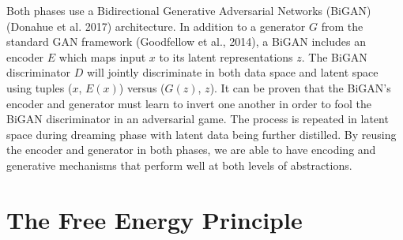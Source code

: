 \documentclass{article}
\begin{document}
Both phases use a Bidirectional Generative Adversarial Networks (BiGAN) (Donahue et al. 2017) architecture. In addition to a generator $G$ from the standard GAN framework (Goodfellow et al., 2014), a BiGAN includes an encoder $E$ which maps input $x$ to its latent representations $z$. The BiGAN discriminator $D$  will jointly discriminate in both data space and latent space using tuples ($x$, $E(x)$) versus ($G(z)$, $z$). It can be proven that the BiGAN's encoder and generator must learn to invert one another in order to fool the BiGAN discriminator in an adversarial game. The process is repeated in latent space during dreaming phase with latent data being further distilled. By reusing the encoder and generator in both phases, we are able to have encoding and generative mechanisms that perform well at both levels of abstractions. 



\section{The Free Energy Principle}
\end{document}
